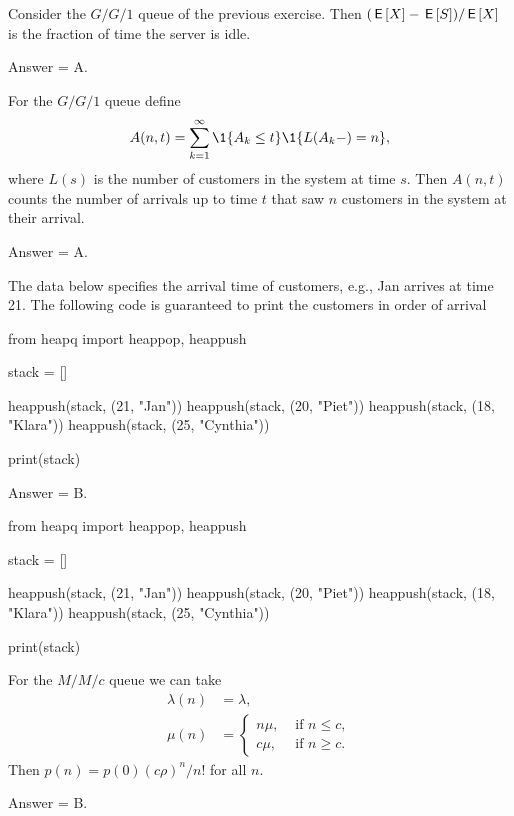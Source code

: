 \begin{exercise}[201903]
Consider the $G/G/1$ queue of the previous exercise. Then $(\,\mathsf{E}\left[X\right] - \,\mathsf{E}\left[S\right])/\,\mathsf{E}\left[X\right]$ is the fraction of time the server is idle.

\begin{solution}
Answer = A.
\end{solution}
\end{exercise}

\begin{exercise}[201903]
For the $G/G/1$ queue define 
\begin{equation*}
  A(n,t) = \sum_{k=1}^\infty \1{A_k \leq t}\1{L(A_k-) = n},
\end{equation*}
where $L(s)$ is the number of customers in the system at time $s$.
Then $A(n,t)$ counts the number of arrivals up to time $t$ that saw $n$ customers in the system at their arrival.

\begin{solution}
Answer = A.
\end{solution}
\end{exercise}


\begin{exercise}[201903]
  The data below specifies the arrival time of customers, e.g., Jan arrives at time 21.
  The following code is guaranteed to print the customers in order of arrival
\begin{pyverbatim}
from heapq import heappop, heappush


stack = []

heappush(stack, (21, "Jan"))
heappush(stack, (20, "Piet"))
heappush(stack, (18, "Klara"))
heappush(stack, (25, "Cynthia"))

print(stack)
  \end{pyverbatim}
\begin{solution}
Answer = B.

\begin{pyconsole}
from heapq import heappop, heappush


stack = []

heappush(stack, (21, "Jan"))
heappush(stack, (20, "Piet"))
heappush(stack, (18, "Klara"))
heappush(stack, (25, "Cynthia"))

print(stack)
\end{pyconsole}


\end{solution}
\end{exercise}

\begin{exercise}[201903]
For the $M/M/c$ queue we can take
  \begin{align*}
\lambda(n) &= \lambda, \\
    \mu(n) &= 
  \begin{cases}
    n\mu, &\text{ if } n \leq c, \\
    c\mu, &\text{ if } n \geq c.
  \end{cases}
  \end{align*}
Then $p(n) = p(0) (c\rho)^n/n!$ for all $n$. 
\begin{solution}
Answer = B.
\end{solution}
\end{exercise}

